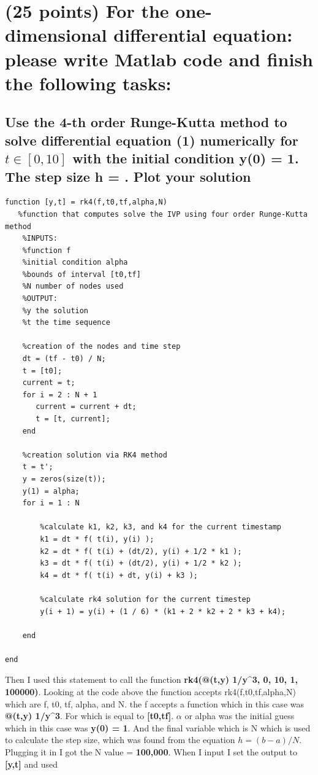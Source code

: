 \documentclass[12pt,letterpaper]{article}
\begin{document}
\section{(25 points) For the one-dimensional differential equation:  please write Matlab code and finish the following tasks:}
\subsection{Use the 4-th order Runge-Kutta method to solve differential equation (1) numerically
for \boldmath$t\in[0, 10]$ with the initial condition y(0) = 1. The step size h = . Plot your
solution}
\begin{lstlisting}
function [y,t] = rk4(f,t0,tf,alpha,N)
   %function that computes solve the IVP using four order Runge-Kutta method
    %INPUTS: 
    %function f
    %initial condition alpha
    %bounds of interval [t0,tf]
    %N number of nodes used
    %OUTPUT: 
    %y the solution
    %t the time sequence
    
    %creation of the nodes and time step
    dt = (tf - t0) / N;
    t = [t0];
    current = t;
    for i = 2 : N + 1
       current = current + dt;
       t = [t, current]; 
    end
    
    %creation solution via RK4 method
    t = t';
    y = zeros(size(t));
    y(1) = alpha;
    for i = 1 : N
        
        %calculate k1, k2, k3, and k4 for the current timestamp
        k1 = dt * f( t(i), y(i) ); 
        k2 = dt * f( t(i) + (dt/2), y(i) + 1/2 * k1 ); 
        k3 = dt * f( t(i) + (dt/2), y(i) + 1/2 * k2 ); 
        k4 = dt * f( t(i) + dt, y(i) + k3 ); 
        
        %calculate rk4 solution for the current timestep
        y(i + 1) = y(i) + (1 / 6) * (k1 + 2 * k2 + 2 * k3 + k4);
        
    end 

end
\end{lstlisting}
Then I used this statement to call the function \textbf{rk4(@(t,y) 1/y\^{}3, 0, 10, 1, 100000)}. Looking at the code above the function accepts rk4(f,t0,tf,alpha,N) which are f, t0, tf, alpha, and N.
the f accepts a function which in this case was \textbf{@(t,y) 1/y\^{}3}. For  which is equal to \textbf{[t0,tf]}. $\alpha$ or alpha was the initial guess which in this case was \textbf{y(0) = 1}.
And the final variable which is N which is used to calculate the step size, which was found from the equation \boldmath$h = (b-a)/N$. Plugging it in I got the N value = \textbf{100,000}. When I input I set the output to \textbf{[y,t]} and used
\end{document}
